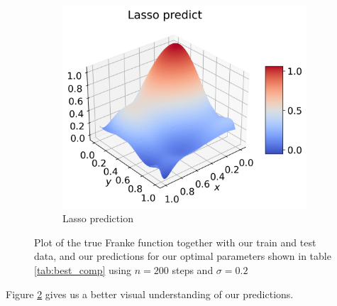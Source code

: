 \documentclass[12pt]{article}
\begin{document}
\begin{figure}[H]
\begin{subfigure}{.5\textwidth}
    \centering
    \includegraphics[width=\textwidth]{../figures/lasso_pred_franke_extra.png}
    \caption{Lasso prediction}
    \label{fig:extra_pred_lasso}
  \end{subfigure}
  \caption{Plot of the true Franke function together with our train and test data, and our predictions for our optimal parameters shown in table \ref{tab:best_comp} using $n=200$ steps and $\sigma=0.2$ }
  \label{fig:extra_pred_franke}
\end{figure}
Figure \ref{fig:extra_pred_franke} gives us a better visual understanding of our predictions.
\end{document}
